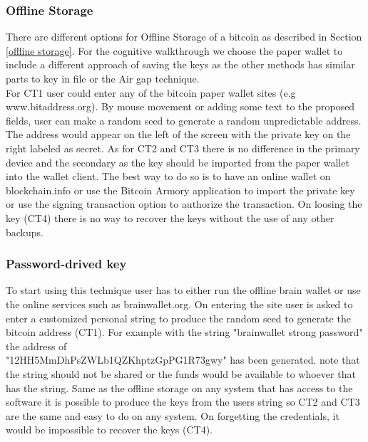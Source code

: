 \subsubsection{Offline Storage}
There are different options for Offline Storage of a bitcoin as described in Section \ref{offline storage}. For the cognitive walkthrough we choose the paper wallet to include a different approach of saving the keys as the other methods has similar parts to key in file or the Air gap technique.\\
For CT1 user could enter any of the bitcoin paper wallet sites (e.g www.bitaddress.org). By mouse movement or adding some text to the proposed fields, user can make a random seed to generate a random unpredictable address. The address would appear on the left of the screen with the private key on the right labeled as secret. As for CT2 and CT3 there is no difference in the primary device and the secondary as the key should be imported from the paper wallet into the wallet client. The best way to do so is to have an online wallet on blockchain.info or use the Bitcoin Armory application to import the private key or use the signing transaction option to authorize the transaction. On loosing the key (CT4) there is no way to recover the keys without the use of any other backups.

\subsubsection{Password-drived key}
To start using this technique user has to either run the offline brain wallet or use the online services such as brainwallet.org. On entering the site user is asked to enter a customized personal string to produce the random seed to generate the bitcoin address (CT1). For example with the string "brainwallet strong password" the address of \\ "12HH5MmDhPsZWLb1QZKhptzGpPG1R73gwy" has been generated. note that the string should not be shared or the funds would be available to whoever that has the string. Same as the offline storage on any system that has access to the software it is possible to produce the keys from the users string so CT2 and CT3 are the same and easy to do on any system. On forgetting the credentials, it would be impossible to recover the keys (CT4).


